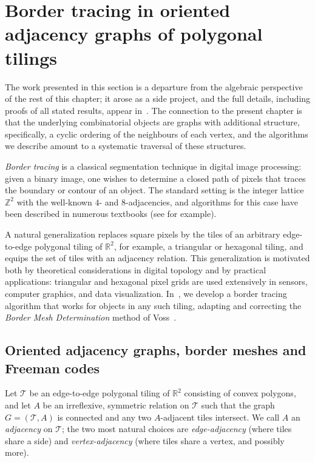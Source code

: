 
\section{Border tracing in oriented adjacency graphs of polygonal tilings}\label{sec:border_tracing}

The work presented in this section is a departure from the algebraic perspective of the rest of this chapter; it arose as a side project, and the full details, including proofs of all stated results, appear in~\cite{WiederholdMatosWiederhold2026}.
The connection to the present chapter is that the underlying combinatorial objects are graphs with additional structure, specifically, a cyclic ordering of the neighbours of each vertex, and the algorithms we describe amount to a systematic traversal of these structures.

\emph{Border tracing} is a classical segmentation technique in digital image processing: given a binary image, one wishes to determine a closed path of pixels that traces the boundary or contour of an object.
The standard setting is the integer lattice~$\mathbb{Z}^2$ with the well-known $4$- and $8$-adjacencies, and algorithms for this case have been described in numerous textbooks (see \cite{gonzalez2018,klette2004} for example).

A natural generalization replaces square pixels by the tiles of an arbitrary edge-to-edge polygonal tiling of $\mathbb{R}^2$, for example, a triangular or hexagonal tiling, and equips the set of tiles with an
adjacency relation.
This generalization is motivated both by theoretical considerations in digital topology and by practical applications: triangular and hexagonal pixel grids are used extensively in sensors, computer graphics, and data visualization.
In~\cite{WiederholdMatosWiederhold2026}, we develop a border tracing algorithm that works for objects in any such tiling, adapting and correcting the \emph{Border Mesh Determination} method of Voss~\cite{voss1993}.

\subsection{Oriented adjacency graphs, border meshes and Freeman codes}

Let $\mathcal{T}$ be an edge-to-edge polygonal tiling of $\mathbb{R}^2$ consisting of convex polygons, and let $A$ be an irreflexive, symmetric relation on $\mathcal{T}$ such that the graph $G = (\mathcal{T}, A)$ is connected and any two $A$-adjacent tiles intersect.
We call $A$ an \emph{adjacency} on $\mathcal{T}$; the two most natural choices are \emph{edge-adjacency} (where tiles share a side) and \emph{vertex-adjacency} (where tiles share a vertex, and possibly more).


